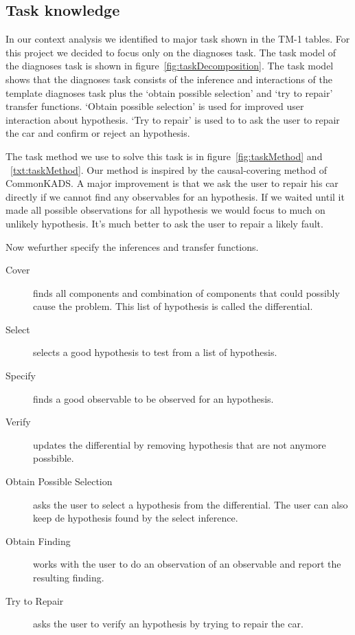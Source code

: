 \subsection{Task knowledge}
In our context analysis we identified to major task shown in the TM-1 tables.
For this project we decided to focus only on the diagnoses task. The task model
of the diagnoses task is shown in figure~\ref{fig:taskDecomposition}. The task
model shows that the diagnoses task consists of the inference and
interactions of the template diagnoses task plus the `obtain possible selection'
and `try to repair' transfer functions. `Obtain possible selection' is used for 
improved user interaction about hypothesis.
`Try to repair' is used to to ask the user to repair the car and confirm or
reject an hypothesis.

The task method we use to solve this task is in figure~\ref{fig:taskMethod} and
~\ref{txt:taskMethod}. Our method is inspired by the causal-covering method of
CommonKADS. A major improvement is that we ask the user to repair his car directly if
we cannot find any observables for an hypothesis. If we waited until it made all
possible observations for all hypothesis we would focus to much on unlikely
hypothesis. It's much better to ask the user to repair a likely fault.

Now wefurther specify the inferences and transfer functions.
\begin{description}
\item[Cover] finds all components and combination of components that could
possibly cause the problem. This list of hypothesis is called the differential.
\item[Select] selects a good hypothesis to test from a list of hypothesis.
\item[Specify] finds a good observable to be observed for an hypothesis.
\item[Verify] updates the differential by removing hypothesis that are not
anymore possbible.
\item[Obtain Possible Selection] asks the user to select a hypothesis from the
differential. The user can also keep de hypothesis found by the select
inference.
\item[Obtain Finding] works with the user to do an observation of an observable
and report the resulting finding.
\item[Try to Repair] asks the user to verify an hypothesis by trying to repair
the car. 
\end{description}

